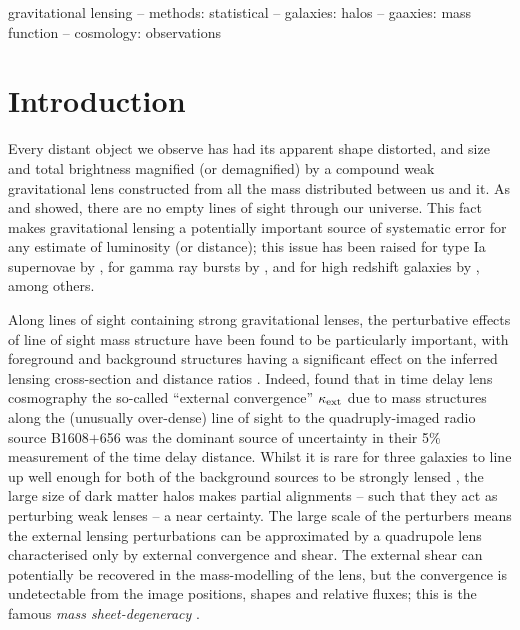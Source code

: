 \documentclass[useAMS,usenatbib]{mn2e}
\begin{document}
\begin{keywords}
  gravitational lensing   --
  methods: statistical    --
  galaxies: halos         --
  gaaxies: mass function  --
  cosmology: observations
\end{keywords}

\setcounter{footnote}{1}


\section{Introduction}
\label{sec:intro}

Every distant object we observe has had its apparent shape distorted,
and size and total brightness magnified (or demagnified) by a compound
weak gravitational lens constructed from all the mass distributed
between us and it. As \citet{Vale+White2003} and \citet{HilbertEtal2007}
showed, there are no empty lines of sight through our universe. This
fact makes gravitational lensing a potentially important source of
systematic error for any estimate of luminosity (or distance); this 
issue has been 
raised for \eg type Ia supernovae by
\citet[][]{Holz+Wald1998,Holz+Linder2005}, for gamma ray bursts by
\citet[][]{Oguri+Takahashi2006,Wang+Dai2011},  and for high redshift
galaxies by \citet{BradacEtal2009}, among others. 

Along lines of sight containing strong gravitational lenses, the
perturbative effects of line of sight mass structure have been found to
be particularly important, with foreground and background structures
having a significant effect on the inferred lensing cross-section
\citep[\eg][]{WongEtal2012} and distance ratios
\citep[][]{DalalEtal2005}. Indeed, \citet{SuyuEtal2010} found that in
time delay lens cosmography the so-called ``external convergence''
$\kappa_{\rm ext}$ due to mass structures along the (unusually over-dense) line
of sight to the quadruply-imaged radio source B1608$+$656 was the
dominant source of uncertainty in their 5\% measurement of the time delay distance. 
Whilst it is rare for three galaxies to line up well enough for both of
the background sources to be strongly lensed \citep{GavazziEtal2008,CollettEtal2012a}, 
the large size of dark matter halos makes partial alignments -- such that they
act as perturbing weak lenses --  a near certainty. The large scale of the
perturbers means the external lensing perturbations can be approximated
by a quadrupole lens characterised only by external convergence and shear.
The external shear can potentially be recovered in the
mass-modelling of the lens, but the convergence is undetectable from the
image positions, shapes and relative fluxes; this is the famous {\emph{ 
mass sheet-degeneracy}} \citep[see e.g.][for details]{FalcoEtal1985}.
\end{document}
